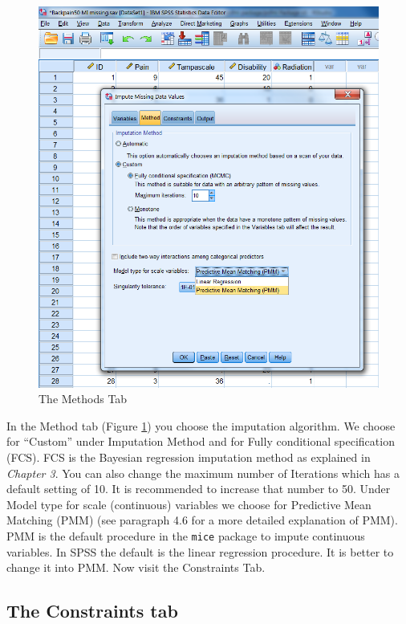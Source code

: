 \documentclass[
]{book}
\begin{document}
\begin{figure}

{\centering \includegraphics[width=0.9\linewidth]{images/fig4.7} 

}

\caption{The Methods Tab}\label{fig:fig4-7}
\end{figure}

In the Method tab (Figure \ref{fig:fig4-7}) you choose the imputation algorithm. We choose for ``Custom'' under Imputation Method and for Fully conditional specification (FCS). FCS is the Bayesian regression imputation method as explained in \emph{Chapter 3}. You can also change the maximum number of Iterations which has a default setting of 10. It is recommended to increase that number to 50. Under Model type for scale (continuous) variables we choose for Predictive Mean Matching (PMM) (see paragraph 4.6 for a more detailed explanation of PMM). PMM is the default procedure in the \texttt{mice} package to impute continuous variables. In SPSS the default is the linear regression procedure. It is better to change it into PMM. Now visit the Constraints Tab.

\hypertarget{the-constraints-tab}{%
\subsection{The Constraints tab}\label{the-constraints-tab}}
\end{document}
